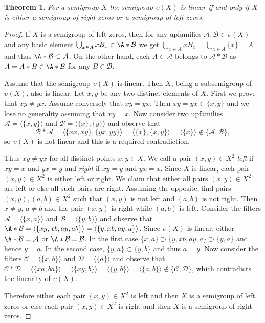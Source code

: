 \documentclass{amsart}
\newtheorem{theorem}[lem]{Theorem}
\theoremstyle{definition}
\begin{document}
\begin{theorem}\label{t4.1} For a semigroup $X$ the semigroup ${\upsilon}(X)$ is linear if and only if $X$ is either a semigroup of right zeros or a semigroup of left zeros.
\end{theorem}

\begin{proof} If $X$ is a semigroup of left zeros, then for any upfamilies ${\mathcal A},\mathcal B\in{\upsilon}(X)$ and any basic element $\bigcup_{x\in A}xB_x\in\A*\mathcal B$ we get $\bigcup_{x\in A}xB_x=\bigcup_{x\in A}\{x\}=A$ and thus $\A*\mathcal B\subset{\mathcal A}$. On the other hand, each $A\in{\mathcal A}$ belongs to $\mathcal A*\mathcal B$ as $A=A*B\in\A*\mathcal B$ for any $B\in\mathcal B$.

 Assume that the semigroup ${\upsilon}(X)$ is linear. Then $X$, being a subsemigroup of ${\upsilon}(X)$, also is linear. Let $x,y$ be any two distinct elements of $X$. First we prove that $xy\ne yx$.
Assume conversely that $xy=yx$. Then $xy=yx\in\{x,y\}$ and we lose no generality assuming that $xy=x$. Now consider two upfamilies ${\mathcal A}={\langle}\{x,y\}{\rangle}$ and $\mathcal B={\langle}\{x\},\{y\}{\rangle}$ and observe that
$$\mathcal B*{\mathcal A}={\langle}\{xx,xy\},\{yx,yy\}{\rangle}={\langle}\{x\},\{x,y\}{\rangle}={\langle}\{x\}{\rangle}\notin\{{\mathcal A},\mathcal B\},$$ so $\upsilon(X)$ is not linear and this is a required contradiction.

Thus $xy\ne yx$ for all distinct points $x,y\in X$. We call a pair $(x,y)\in X^2$ {\em left} if $xy=x$ and $yx=y$ and {\em right} if $xy=y$ and $yx=x$. Since $X$ is linear, each pair $(x,y)\in X^2$ is either left or right. We claim that either all pairs $(x,y)\in X^2$ are left or else all such pairs are right. Assuming the opposite, find pairs $(x,y),(a,b)\in X^2$ such that $(x,y)$ is not left and $(a,b)$ is not right. Then $x\ne y$, $a\ne b$ and the pair $(x,y)$ is right while $(a,b)$ is left. Consider the filters ${\mathcal A}={\langle}\{x,a\}{\rangle}$ and $\mathcal B={\langle}\{y,b\}{\rangle}$ and observe that $\A*\mathcal B={\langle}\{xy,xb,ay,ab\}{\rangle}={\langle}\{y,xb,ay,a\}{\rangle}$. Since ${\upsilon}(X)$ is linear, either $\A*\mathcal B={\mathcal A}$ or $\A*\mathcal B=\mathcal B$. In the first case $\{x,a\}\supset\{y,xb,ay,a\} \supset\{y,a\}$ and hence $y=a$. In the second case, $\{y,a\}\subset\{y,b\}$ and thus $a=y$. Now consider the filters $\mathcal C={\langle} \{x,b\}{\rangle}$ and $\mathcal D={\langle}\{a\}{\rangle}$ and observe that $\mathcal C*\mathcal D={\langle}\{xa,ba\}{\rangle}={\langle}\{xy,b\}{\rangle}={\langle}\{y,b\}{\rangle}={\langle}\{a,b\}{\rangle}\notin\{\mathcal C,\mathcal D\}$, which contradicts the linearity of ${\upsilon}(X)$.

Therefore either each pair $(x,y)\in X^2$ is left and then $X$ is a semigroup of left zeros or else each pair $(x,y)\in X^2$ is right and then $X$ is a semigroup of right zeros.
\end{proof}
\end{document}
